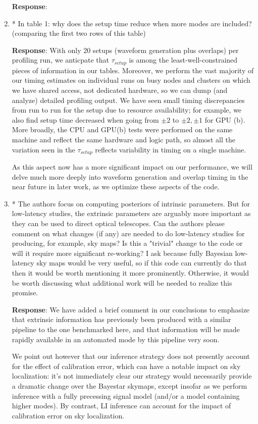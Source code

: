 \documentclass[onecolumn]{revtex4}
\begin{document}
\begin{enumerate}
\noindent \textbf{Response}:

\item * In table 1: why does the setup time reduce when more modes are
included? (comparing the first two rows of this table)

\noindent \textbf{Response}:  
With only 20 setups (waveform generation plus overlaps) per profiling run,  we anticpate that $\tau_{setup}$ is among the
least-well-constrained pieces of information in our tables.  Moreover, we perform the vast majority of our timing estimates on individual runs on busy nodes and clusters on which we
have shared access, not
dedicated hardware, so we can dump (and analyze) detailed profiling output.  We have seen small timing discrepancies from run to run for the setup due to resource
availability; for example, we also find setup time decreased when going from $\pm 2$ to $\pm 2, \pm 1$ for GPU (b).
More broadly, the CPU and GPU(b) tests were performed on the same machine and reflect the same hardware and logic
path, so almost all the variation seen in the $\tau_{setup}$ reflects variability in timing on a single machine. 

As this aspect now has a more significant impact on our performance,  we will delve much more deeply into waveform generation and overlap timing in the near future in later work, as we
optimize these aspects of the code.  


\item * The authors focus on computing posteriors of intrinsic parameters.
But for low-latency studies, the extrinsic parameters are arguably
more important as they can be used to direct optical telescopes. Can
the authors please comment on what changes (if any) are needed to do
low-latency studies for producing, for example, sky maps? Is this a
"trivial" change to the code or will it require more significant
re-working? I ask because fully Bayesian low-latency sky maps would be
very useful, so if this code can currently do that then it would be
worth mentioning it more prominently. Otherwise, it would be worth
discussing what additional work will be needed to realize this
promise.

\noindent \textbf{Response}:  We have added a brief comment in our conclusions to emphasize that extrinsic information
has previously been produced with a similar pipeline to the one benchmarked  here,  and that information will be
made rapidly available in an automated mode by this pipeline very soon.

We point out however that our inference strategy does not presently account for the effect of calibration error, which can have a
notable impact on sky localization: it's not immediately clear our strategy would necessarily provide a dramatic change
over the Bayestar skymaps, except insofar as we perform inference with a fully precessing signal model (and/or a model
containing higher modes).     By contrast, LI inference can account for the impact of calibration error on sky localization.


\end{enumerate}
\end{document}
